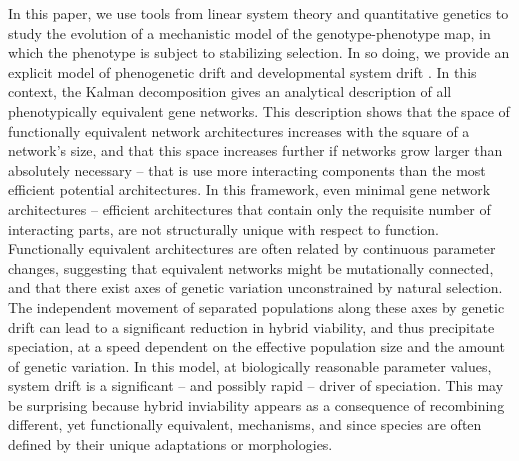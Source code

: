 \documentclass{article}
\newcommand{\1}{\mathbbm{1}}
\begin{document}
In this paper, we use tools from linear system theory and quantitative genetics
to study the evolution of a mechanistic model of the genotype-phenotype map, 
in which the phenotype is subject to stabilizing selection.
In so doing, we provide an explicit model of
phenogenetic drift \citep{weiss2000phenogenetic} and developmental system drift \citep{true2001developmental}.
In this context, the Kalman decomposition \citep{kalman1963mathematical}
gives an analytical description of all phenotypically equivalent gene networks.
This description shows that the space of functionally equivalent network architectures increases with the square of a network's size,
and that this space increases further if networks grow larger than absolutely necessary -- that is use more interacting components than the most efficient potential architectures.
In this framework, even minimal gene network architectures -- efficient architectures that contain only the requisite number of interacting parts,
are not structurally unique with respect to function.
Functionally equivalent architectures are often related by continuous parameter changes, suggesting that equivalent networks might be mutationally connected, 
and that there exist axes of genetic variation unconstrained by natural selection.
The independent movement of separated populations along these axes by genetic drift
can lead to a significant reduction in hybrid viability, and thus precipitate speciation,
at a speed dependent on the effective population size and the amount of genetic variation. 
In this model, at biologically reasonable parameter values,
system drift is a significant -- and possibly rapid -- driver of speciation.
This may be surprising because
hybrid inviability appears as a consequence of recombining different, yet functionally equivalent, mechanisms, and since species are often defined by their unique adaptations or morphologies. 
\end{document}
